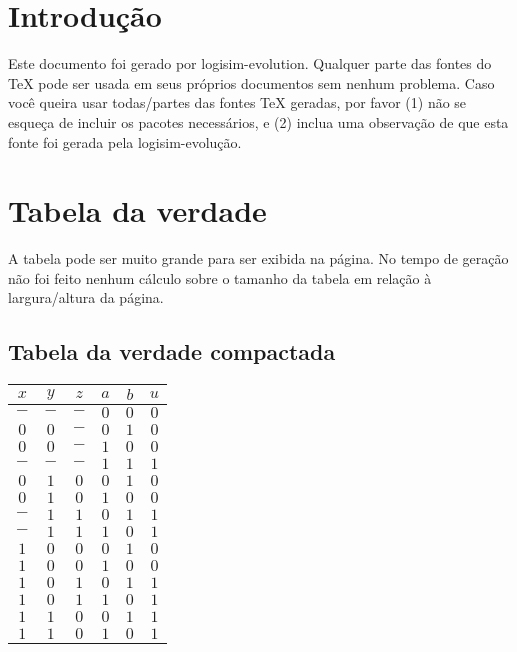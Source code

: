 \documentclass [15pt,a4paper,twoside]{article}
\begin{document}
\section{Introdução}
Este documento foi gerado por logisim-evolution. Qualquer parte das fontes do TeX pode ser usada em seus próprios documentos sem nenhum problema. Caso você queira usar todas/partes das fontes TeX geradas, por favor (1) não se esqueça de incluir os pacotes necessários, e (2) inclua uma observação de que esta fonte foi gerada pela logisim-evolução.
\section{Tabela da verdade}
A tabela pode ser muito grande para ser exibida na página. No tempo de geração não foi feito nenhum cálculo sobre o tamanho da tabela em relação à largura/altura da página.
\subsection{Tabela da verdade compactada}
\begin{center}
\begin{tabular}{ccccc|c}
$x$&$y$&$z$&$a$&$b$&$u$\\
\hline
$-$&$-$&$-$&$0$&$0$&$0$\\
$0$&$0$&$-$&$0$&$1$&$0$\\
$0$&$0$&$-$&$1$&$0$&$0$\\
$-$&$-$&$-$&$1$&$1$&$1$\\
$0$&$1$&$0$&$0$&$1$&$0$\\
$0$&$1$&$0$&$1$&$0$&$0$\\
$-$&$1$&$1$&$0$&$1$&$1$\\
$-$&$1$&$1$&$1$&$0$&$1$\\
$1$&$0$&$0$&$0$&$1$&$0$\\
$1$&$0$&$0$&$1$&$0$&$0$\\
$1$&$0$&$1$&$0$&$1$&$1$\\
$1$&$0$&$1$&$1$&$0$&$1$\\
$1$&$1$&$0$&$0$&$1$&$1$\\
$1$&$1$&$0$&$1$&$0$&$1$\\

\end{tabular}
\end{center}
\end{document}

